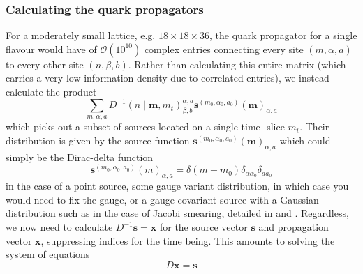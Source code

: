 \documentclass[a4paper,10pt]{article}
\begin{document}
\subsubsection{Calculating the quark propagators}
For a moderately small lattice, e.g. $18\times18\times 36$, the quark propagator for a single flavour would have of $\mathcal{O}(10^{10})$ complex entries connecting every site $(m,\alpha,a)$ to every other site $(n,\beta,b)$. Rather than calculating this entire matrix (which carries a very low information density due to correlated entries), we instead calculate the product
\begin{equation}
\sum_{m, \alpha, a} D^{-1}(n \mid\boldsymbol{m},m_t)_{\beta,b}^{\alpha,a} \boldsymbol{s}^{\left(m_{0}, \alpha_{0}, a_{0}\right)}(\boldsymbol{m})_{\alpha,a}
\end{equation}
which picks out a subset of sources located on a single time- slice $m_t$. Their distribution is given by the source function $\boldsymbol{s}^{\left(m_{0}, \alpha_{0}, a_{0}\right)}(\boldsymbol{m})_{\alpha,a}$ which could simply be the Dirac-delta function
\begin{equation}
\boldsymbol{s}^{\left(m_{0}, \alpha_{0}, a_{0}\right)}(m)_{\alpha,a}=\delta\left(m-m_{0}\right) \delta_{\alpha \alpha_{0}} \delta_{a a_{0}}
\end{equation}
in the case of a point source, some gauge variant distribution, in which case you would need to fix the gauge, or a gauge covariant source with a Gaussian distribution such as in the case of Jacobi smearing, detailed in \cite{gusken1989non} and \cite{best1997pi}. Regardless, we now need to calculate $D^{-1}\boldsymbol{s} = \boldsymbol{x}$ for the source vector $\boldsymbol{s}$ and propagation vector $\boldsymbol{x}$, suppressing indices for the time being. This amounts to solving the system of equations
\begin{equation} \label{eq:Dx_s}
D\boldsymbol{x}=\boldsymbol{s}
\end{equation}
\end{document}
